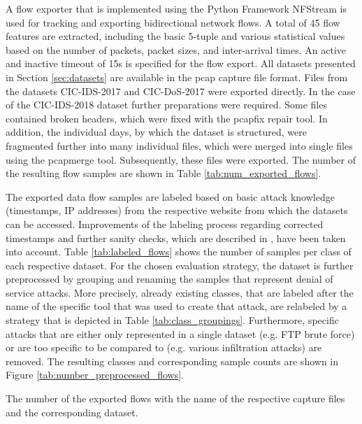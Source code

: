 \documentclass[../../main.tex]{subfiles}
\begin{document}
A flow exporter that is implemented using the Python Framework NFStream is used for tracking and exporting bidirectional network flows. A total of 45 flow features are extracted, including the basic 5-tuple and various statistical values based on the number of packets, packet sizes, and inter-arrival times. An active and inactive timeout of 15s is specified for the flow export. All datasets presented in Section \ref{sec:datasets} are available in the pcap capture file format. Files from the datasets CIC-IDS-2017 and CIC-DoS-2017 were exported directly. In the case of the CIC-IDS-2018 dataset further preparations were required. Some files contained broken headers, which were fixed with the pcapfix repair tool. In addition, the individual days, by which the dataset is structured, were fragmented further into many individual files, which were merged into single files using the pcapmerge tool. Subsequently, these files were exported. The number of the resulting flow samples are shown in Table \ref{tab:num_exported_flows}.


The exported data flow samples are labeled based on basic attack knowledge (timestamps, IP addresses) from the respective website from which the datasets can be accessed. Improvements of the labeling process regarding corrected timestamps and further sanity checks, which are described in \cite{engelen2021}, have been taken into account. Table \ref{tab:labeled_flows} shows the number of samples per class of each respective dataset. For the chosen evaluation strategy, the dataset is further preprocessed by grouping and renaming the samples that represent denial of service attacks. More precisely, already existing classes, that are labeled after the name of the specific tool that was used to create that attack, are relabeled by a strategy that is depicted in Table \ref{tab:class_groupings}. Furthermore, specific attacks that are either only represented in a single dataset (e.g. FTP brute force) or are too specific to be compared to (e.g. various infiltration attacks) are removed. The resulting classes and corresponding sample counts are shown in Figure \ref{tab:number_preprocessed_flows}. 


\begin{table}
    \centering
    \footnotesize
    \centering
    \setlength{\extrarowheight}{0pt}
    \addtolength{\extrarowheight}{\aboverulesep}
    \addtolength{\extrarowheight}{\belowrulesep}
    \setlength{\aboverulesep}{0pt}
    \setlength{\belowrulesep}{0pt}
    \setlength{\extrarowheight}{.1em}
    
    \caption[Exported Flows]{The number of the exported flows with the name of the respective capture files and the corresponding dataset.}
    \label{tab:num_exported_flows}
\end{table}
\end{document}
